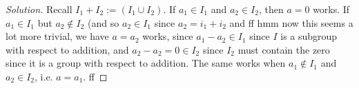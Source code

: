 \documentclass{article}
\begin{document}
\begin{proof}[Solution]\let\qed\relax
	Recall $I_1 + I_2 := (I_1 \cup I_2)$.
	If $a_1 \in I_1$ and $a_2 \in I_2$, then $a = 0$ works.
	If $a_1 \in I_1$ but $a_2 \not\in I_2$ (and so $a_2 \in I_1$
	since $a_2 = i_1 + i_2$ and ff hmm now this seems a lot more trivial,
	we have $a = a_2$ works, since $a_1 - a_2 \in I_1$ since $I$ is a subgroup
	with respect to addition,
	and $a_2 - a_2 = 0 \in I_2$ since $I_2$ must contain the zero
	since it is a group with respect to addition.
	The same works when $a_1 \not\in I_1$ and $a_2 \in I_2$, i.e. $a = a_1$.
	ff
\end{proof}
\end{document}
